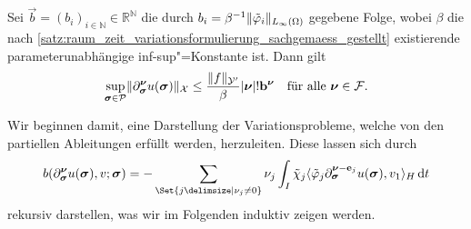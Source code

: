 \documentclass[../main.tex]{subfiles}
\begin{document}
\begin{Satz}
\label{satz:abschaetzung_norm_partieller_ableitungen}
    Sei $\vec b = (b_i)_{i \in \mathbb{N}} \in \mathbb{R}^{\mathbb{N}}$ die durch $b_{i} = \beta^{-1} \lVert\tilde{\varphi}_{i}\rVert_{L_{\infty}(\Omega)}$ gegebene Folge, wobei $\beta$ die nach \cref{satz:raum_zeit_variationsformulierung_sachgemaess_gestellt} existierende parameterunabhängige inf-sup"=Konstante ist.
    Dann gilt
    \begin{equation}
        \label{eq:abschaetzung_norm_partieller_ableitungen}
        \sup_{\bm\sigma \in \mathcal P} \norm{\partial^{\bm\nu}_{\bm\sigma} u(\bm\sigma)}_{\mathcal X} \leq \frac{\norm{f}_{\mathcal Y'}}{\beta} \abs{\bm\nu}! \vec b^{\bm\nu} \quad \fa \bm \nu \in \mathcal F.
    \end{equation}

    \begin{Beweis}
        Wir beginnen damit, eine Darstellung der Variationsprobleme, welche von den partiellen Ableitungen erfüllt werden, herzuleiten.
        Diese lassen sich durch
        \begin{equation}
        \label{eq:abschaetzung_norm_partieller_ableitungen:rekursiv}
            b(\partial^{\bm\nu}_{\bm\sigma} u(\bm\sigma), v; \bm\sigma)
            = - \sum_{\Set{j \given \nu_{j} \neq 0}} \nu_{j} \int_{I} \tilde{\chi}_{j} \skp{\tilde{\varphi}_{j} \partial^{\bm\nu - \vec e_{j}}_{\bm\sigma} u(\bm\sigma)}{v_{1}}{H} \diff t
        \end{equation}
        rekursiv darstellen, was wir im Folgenden induktiv zeigen werden.


\end{Beweis}
\end{Satz}
\end{document}
